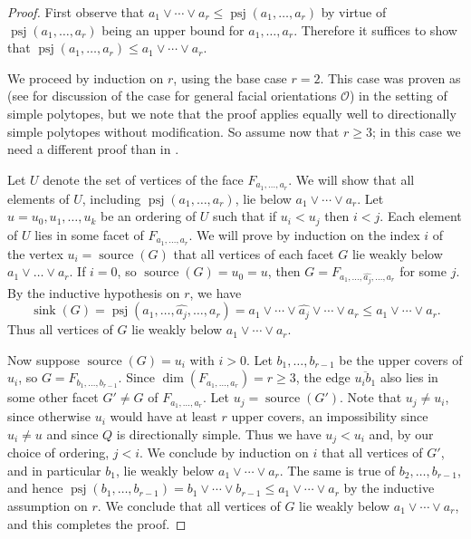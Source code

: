 \documentclass[12pt]{amsart}
\theoremstyle{plain}
\theoremstyle{definition}
\theoremstyle{remark}
\DeclareMathOperator{\psj}{psj}
\DeclareMathOperator{\sink}{sink}
\DeclareMathOperator{\srce}{source}
\begin{document}
\begin{proof}
First observe that $a_1\vee \cdots \vee a_r \le \psj(a_1,\dots ,a_r)$ by virtue of $\psj(a_1,\dots ,a_r)$ being an upper bound for $a_1,\dots ,a_r$.  Therefore it suffices to show that $\psj(a_1,\dots ,a_r) \le a_1 \vee \cdots \vee a_r$.

We proceed by induction on $r$, using the base case $r=2$. This case was proven as \cite[Thm.~4.6]{He} (see \cite[Thm.~5.13]{He} for discussion of the case for general facial orientations $\mathcal{O}$) in the setting of simple polytopes, but we note that the proof applies equally well to directionally simple polytopes without modification. So assume now that $r \geq 3$; in this case we need a different proof than in \cite{He}.

Let $U$ denote the set of vertices of the face $F_{a_1,\ldots,a_r}$. We will show that all elements of $U$, including $\psj(a_1,\ldots,a_r)$, lie below $a_1 \vee \cdots \vee a_r$. Let $u=u_0, u_1,\ldots, u_k$ be an ordering of $U$ such that if $u_i < u_j$ then $i<j$. Each element of $U$ lies in some facet of $F_{a_1,\ldots,a_r}$. We will prove by induction on the index $i$ of the vertex $u_i=\srce(G)$ that all vertices of each facet $G$ lie weakly below $a_1 \vee \ldots \vee a_r$. If $i=0$, so $\srce(G)=u_0=u$, then $G=F_{a_1,\ldots,\widehat{a_j},\ldots,a_r}$ for some $j$. By the inductive hypothesis on $r$, we have 
\[
\sink(G)=\psj(a_1,\ldots,\widehat{a_j},\ldots,a_r)=a_1 \vee \cdots \vee \widehat{a_j} \vee \cdots \vee a_r \leq a_1 \vee \cdots \vee a_r.
\]
Thus all vertices of $G$ lie weakly below $a_1 \vee \cdots \vee a_r$.

Now suppose $\srce(G)=u_i$ with $i>0$. Let $b_1,\ldots,b_{r-1}$ be the upper covers of $u_i$, so $G=F_{b_1,\ldots,b_{r-1}}$. Since $\dim(F_{a_1,\ldots,a_r})=r \geq 3$, the edge $\overline{u_ib_1}$ also lies in some other facet $G'\neq G$ of $F_{a_1,\ldots,a_r}$. Let $u_j=\srce(G')$. Note that $u_j \neq u_i$, since otherwise $u_i$ would have at least $r$ upper covers, an impossibility since $u_i \neq u$ and since $Q$ is directionally simple. Thus we have $u_j < u_i$ and, by our choice of ordering, $j<i$. We conclude by induction on $i$ that all vertices of $G'$, and in particular $b_1$, lie weakly below $a_1 \vee \cdots \vee a_r$. The same is true of $b_2,\ldots,b_{r-1}$, and hence $\psj(b_1,\ldots,b_{r-1})= b_1 \vee \cdots \vee b_{r-1} \leq a_1 \vee \cdots \vee a_r$ by the inductive assumption on $r$. We conclude that all vertices of $G$ lie weakly below $a_1 \vee \cdots \vee a_r$, and this completes the proof. 
\end{proof}
\end{document}
